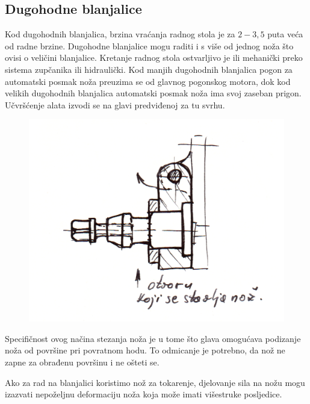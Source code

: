 \documentclass[a4paper,12pt]{article}
\numberwithin{figure}{section}
\begin{document}
\subsection{Dugohodne blanjalice}
Kod dugohodnih blanjalica, brzina vraćanja radnog stola je  za $2 -3,5$ puta veća od radne brzine. Dugohodne blanjalice mogu raditi i s više od jednog noža što ovisi o veličini blanjalice. Kretanje radnog stola ostvarljivo je ili mehanički preko sistema zupčanika ili hidraulički. Kod manjih dugohodnih blanjalica pogon za automatski posmak noža preuzima se od glavnog pogonskog motora, dok kod velikih dugohodnih blanjalica automatski posmak noža ima svoj zaseban prigon. Učvršćenje alata izvodi se na glavi predviđenoj za tu svrhu.
\begin{figure}[!h]
\centering
\includegraphics[scale=0.15]{image_16-1.png}
\end{figure}
\FloatBarrier
Specifičnost ovog načina stezanja noža je u tome što glava omogućava podizanje noža od površine pri povratnom hodu. To odmicanje je potrebno, da nož ne zapne za obrađenu površinu i ne ošteti se.\par 
Ako za rad na blanjalici koristimo nož za tokarenje, djelovanje sila na nožu mogu izazvati nepoželjnu deformaciju noža koja može imati višestruke posljedice.
\end{document}
